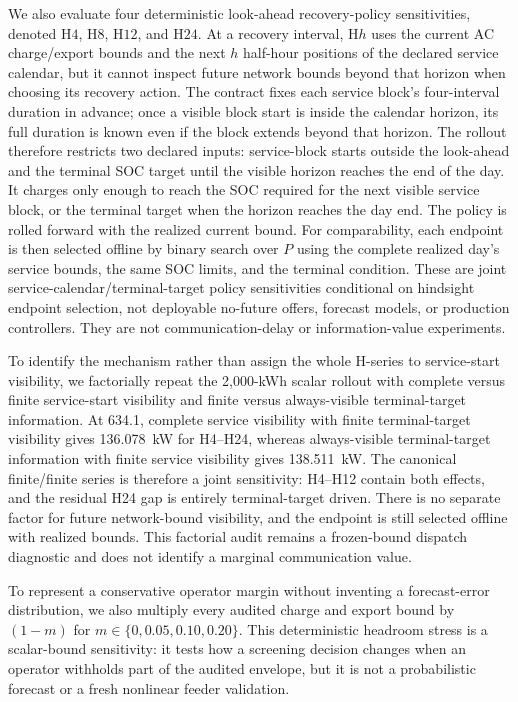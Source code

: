 \documentclass[11pt]{article}
\begin{document}
We also evaluate four deterministic look-ahead recovery-policy sensitivities, denoted $\mathrm{H4}$, $\mathrm{H8}$, $\mathrm{H12}$, and $\mathrm{H24}$. At a recovery interval, $\mathrm{H}h$ uses the current AC charge/export bounds and the next $h$ half-hour positions of the declared service calendar, but it cannot inspect future network bounds beyond that horizon when choosing its recovery action. The contract fixes each service block's four-interval duration in advance; once a visible block start is inside the calendar horizon, its full duration is known even if the block extends beyond that horizon. The rollout therefore restricts two declared inputs: service-block starts outside the look-ahead and the terminal SOC target until the visible horizon reaches the end of the day. It charges only enough to reach the SOC required for the next visible service block, or the terminal target when the horizon reaches the day end. The policy is rolled forward with the realized current bound. For comparability, each endpoint is then selected offline by binary search over $P$ using the complete realized day's service bounds, the same SOC limits, and the terminal condition. These are joint service-calendar/terminal-target policy sensitivities conditional on hindsight endpoint selection, not deployable no-future offers, forecast models, or production controllers. They are not communication-delay or information-value experiments.

To identify the mechanism rather than assign the whole H-series to service-start visibility, we factorially repeat the 2,000-kWh scalar rollout with complete versus finite service-start visibility and finite versus always-visible terminal-target information. At 634.1, complete service visibility with finite terminal-target visibility gives 136.078~kW for H4--H24, whereas always-visible terminal-target information with finite service visibility gives 138.511~kW. The canonical finite/finite series is therefore a joint sensitivity: H4--H12 contain both effects, and the residual H24 gap is entirely terminal-target driven. There is no separate factor for future network-bound visibility, and the endpoint is still selected offline with realized bounds. This factorial audit remains a frozen-bound dispatch diagnostic and does not identify a marginal communication value.

To represent a conservative operator margin without inventing a forecast-error distribution, we also multiply every audited charge and export bound by $(1-m)$ for $m\in\{0,0.05,0.10,0.20\}$. This deterministic headroom stress is a scalar-bound sensitivity: it tests how a screening decision changes when an operator withholds part of the audited envelope, but it is not a probabilistic forecast or a fresh nonlinear feeder validation.
\end{document}
